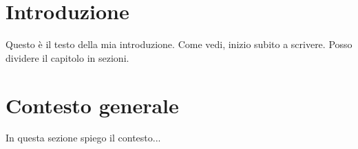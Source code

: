 
\section{Introduzione}
\label{cap:introduzione}

Questo è il testo della mia introduzione. Come vedi, inizio subito a scrivere. 
Posso dividere il capitolo in sezioni.

\section{Contesto generale}
In questa sezione spiego il contesto...

